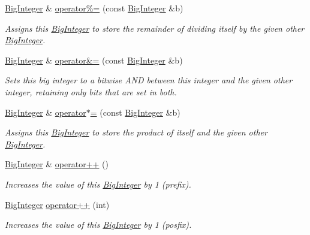 \begin{DoxyCompactItemize}
\mbox{\hyperlink{classBigInteger}{Big\+Integer}} \& \mbox{\hyperlink{classBigInteger_a96b27db3901272401a277296b1344bff}{operator\%=}} (const \mbox{\hyperlink{classBigInteger}{Big\+Integer}} \&b)
\begin{DoxyCompactList}\small\item\em Assigns this \mbox{\hyperlink{classBigInteger}{Big\+Integer}} to store the remainder of dividing itself by the given other \mbox{\hyperlink{classBigInteger}{Big\+Integer}}. \end{DoxyCompactList}\item 
\mbox{\hyperlink{classBigInteger}{Big\+Integer}} \& \mbox{\hyperlink{classBigInteger_a350cb892980e2cd70d9ad9727fc546ac}{operator\&=}} (const \mbox{\hyperlink{classBigInteger}{Big\+Integer}} \&b)
\begin{DoxyCompactList}\small\item\em Sets this big integer to a bitwise A\+ND between this integer and the given other integer, retaining only bits that are set in both. \end{DoxyCompactList}\item 
\mbox{\hyperlink{classBigInteger}{Big\+Integer}} \& \mbox{\hyperlink{classBigInteger_a0f26aa4e4983f70261eb9ca87f97fd2a}{operator$\ast$=}} (const \mbox{\hyperlink{classBigInteger}{Big\+Integer}} \&b)
\begin{DoxyCompactList}\small\item\em Assigns this \mbox{\hyperlink{classBigInteger}{Big\+Integer}} to store the product of itself and the given other \mbox{\hyperlink{classBigInteger}{Big\+Integer}}. \end{DoxyCompactList}\item 
\mbox{\hyperlink{classBigInteger}{Big\+Integer}} \& \mbox{\hyperlink{classBigInteger_a9b078c3ae515fa998cac3395a8dff879}{operator++}} ()
\begin{DoxyCompactList}\small\item\em Increases the value of this \mbox{\hyperlink{classBigInteger}{Big\+Integer}} by 1 (prefix). \end{DoxyCompactList}\item 
\mbox{\hyperlink{classBigInteger}{Big\+Integer}} \mbox{\hyperlink{classBigInteger_ae9a012b2622d85e7dcdf5608d17ab0b0}{operator++}} (int)
\begin{DoxyCompactList}\small\item\em Increases the value of this \mbox{\hyperlink{classBigInteger}{Big\+Integer}} by 1 (posfix). \end{DoxyCompactList}\item 

\end{DoxyCompactItemize}
